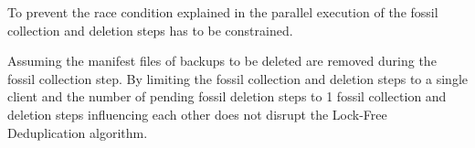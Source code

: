 To prevent the race condition explained in  the parallel execution
of the fossil collection and deletion steps has to be constrained.

\begin{samepage}
    \begin{thm}\label{thm:singleclient}
        Assuming the manifest files of backups to be deleted are removed during the
        fossil collection step.
        By limiting the fossil collection and deletion steps to a single client and the
        number of pending fossil deletion steps to 1 fossil collection and deletion
        steps influencing each other does not disrupt the Lock-Free Deduplication algorithm.
    \end{thm}
\end{samepage}

